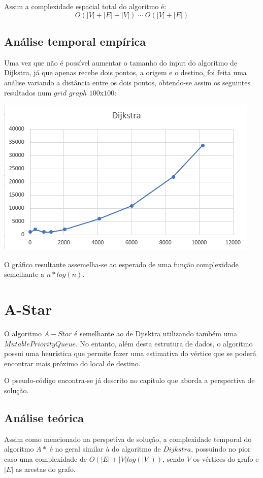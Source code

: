 \documentclass[article, a4paper, 12pt, oneside]{memoir}
\begin{document}
Assim a complexidade espacial total do algoritmo é:
\begin{equation}
O(|V| + |E| + |V|) \sim O(|V|+|E|)
\end{equation}

\subsection{Análise temporal empírica}
Uma vez que não é possível aumentar o tamanho do input do algoritmo de Dijkstra, já que apenas recebe dois pontos, a origem e o destino, foi feita uma análise variando a distância entre os dois pontos, obtendo-se assim os seguintes resultados num $grid$ $graph$ $100$x$100$:

\begin{center}
\includegraphics[scale=0.5]{dijkstra_empiric.png}
\end{center}

O gráfico resultante assemelha-se ao esperado de uma função complexidade semelhante a $n*log(n)$.

\section{A-Star}
O algoritmo $A-Star$ é semelhante ao de Djisktra utilizando também uma $MutablePriorityQueue$.
No entanto, além desta estrutura de dados, o algoritmo possui uma heurística que 
permite fazer uma estimativa do vértice que se poderá encontrar mais próximo do local de destino.

O pseudo-código encontra-se já descrito no capitulo que aborda a perspectiva de solução.
\subsection{Análise teórica}
Assim como mencionado na perspetiva de solução, a complexidade temporal do algoritmo $A*$ é no geral similar à do algoritmo de $Dijkstra$, possuindo no pior caso uma complexidade de $O(|E|+|V|log(|V|))$, sendo $V$ os vértices do grafo e $|E|$ as arestas do grafo.
\end{document}
